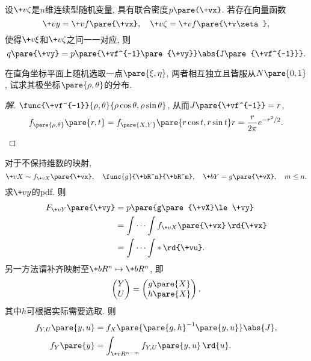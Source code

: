 \documentclass[../Statistics.tex]{subfiles}
\begin{document}
\begin{theorem}
    设$\+v\zeta$是$n$维连续型随机变量, 具有联合密度$p\pare{\+vx}$. 若存在向量函数
    \[ \+vy = \+vf\pare{\+vx},\quad \+v\zeta = \+vf\pare{\+v\zeta}, \]
    使得$\+v\xi$和$\+v\zeta$之间一一对应, 则
    \[ q\pare{\+vy} = p\pare{\+vf^{-1}\pare{\+vy}}\abs{J\pare{\+vf^{-1}}}. \]
\end{theorem}
\begin{sample}
    \begin{ex}
        在直角坐标平面上随机选取一点$\pare{\xi,\eta}$, 两者相互独立且皆服从$N\pare{0,1}$, 试求其极坐标$\pare{\rho,\theta}$的分布.
    \end{ex}
    \begin{proof}[解]
        $\func{\+vf^{-1}}{\rho,\theta}{\rho\cos\theta, \rho\sin\theta}$, 从而$J\pare{\+vf^{-1}} = r$,
        \[ f_{\pare{\rho,\theta}}\pare{r,t} = f_{\pare{X,Y}}\pare{r\cos t, r\sin t}r = \frac{r}{2\pi}e^{-r^2/2}. \qedhere \]
    \end{proof}
\end{sample}
对于不保持维数的映射,
\[ \+vX\sim f_{\+vX}\pare{\+vx},\quad \func{g}{\+bR^n}{\+bR^m},\quad \+bY = g\pare{\+vX},\quad m\le n. \]
求$\+vy$的pdf. 则
\begin{align*}
    F_{\+vY}\pare{\+vy} &= p\pare{g\pare{\+vX}\le \+vy} \\
    &= \int\cdots\int f_{\+vX}\pare{\+vx}\,\rd{\+vx} \\
    &= \int\cdots\int * \,\rd{\+vu}.
\end{align*}
另一方法谓补齐映射至$\+bR^n \mapsto \+bR^n$, 即
\[ \begin{pmatrix}
    Y \\
    U
\end{pmatrix} = \begin{pmatrix}
    g\pare{X} \\
    h\pare{X}
\end{pmatrix}. \]
其中$h$可根据实际需要选取. 则
\begin{align*}
    f_{Y,U}\pare{y,u} &= f_X\pare{\pare{g,h}^{-1}\pare{y,u}}\abs{J}, \\
    f_Y\pare{y} &= \int_{\+vR^{n-m}} f_{Y,U}\pare{y,u}\,\rd{u}.
\end{align*}
\end{document}
